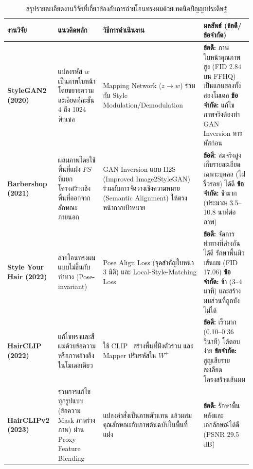 \begin{table}[htbp]
\caption{สรุปรายละเอียดงานวิจัยที่เกี่ยวข้องกับการถ่ายโอนทรงผมด้วยเทคนิคปัญญาประดิษฐ์}
\label{tab:literature_review}
\renewcommand{\arraystretch}{1.15}
\footnotesize
\begin{tabular}{|L{2.1cm}|L{3.3cm}|L{4.1cm}|L{4.6cm}|}
\hline
\textbf{งานวิจัย} & \textbf{แนวคิดหลัก} & \textbf{วิธีการดำเนินงาน} & \textbf{ผลลัพธ์ (ข้อดี/ข้อจำกัด)} \\
\hline
\textbf{StyleGAN2 (2020)}~\cite{karras2020analyzingimprovingimagequality}
& แปลงรหัส $w$ เป็นภาพใบหน้า โดยขยายความละเอียดทีละขั้น 4 ถึง 1024 พิกเซล
& Mapping Network ($z \rightarrow w$) ร่วมกับ Style Modulation/Demodulation
& \textbf{ข้อดี:} ภาพใบหน้าคุณภาพสูง (FID 2.84 บน FFHQ) เป็นแกนของทั้งสองโมเดล
  \newline \textbf{ข้อจำกัด:} แก้ไขภาพจริงต้องทำ GAN Inversion หารหัสก่อน \\
\hline
\textbf{Barbershop (2021)}~\cite{Zhu_2021}
& ผสมภาพโดยใช้พื้นที่แฝง $FS$ ที่แยกโครงสร้างเชิงพื้นที่ออกจากลักษณะภายนอก
& GAN Inversion แบบ II2S (Improved Image2StyleGAN)~\cite{zhu2021improvedstyleganembeddinggood} ร่วมกับการจัดวางเชิงความหมาย
  (Semantic Alignment) ให้ตรงหน้ากากเป้าหมาย
& \textbf{ข้อดี:} สมจริงสูง เก็บรายละเอียดเฉพาะบุคคล (ไฝ ริ้วรอย) ได้ดี
  \newline \textbf{ข้อจำกัด:} ช้ามาก (ประมาณ 3.5--10.8 นาทีต่อภาพ) \\
\hline
\textbf{Style Your Hair (2022)}~\cite{kim2022stylehairlatentoptimization}
& ถ่ายโอนทรงผมแบบไม่ขึ้นกับท่าทาง (Pose-invariant)
& Pose Align Loss (จุดสำคัญใบหน้า 3 มิติ) และ Local-Style-Matching Loss
& \textbf{ข้อดี:} จัดการท่าทางที่ต่างกันได้ดี รักษาพื้นผิวเส้นผม (FID 17.06)
  \newline \textbf{ข้อจำกัด:} ช้า (3--4 นาที) และสร้างผมส่วนที่ถูกบังไม่ได้ \\
\hline
\textbf{HairCLIP (2022)}~\cite{wei2022hairclipdesignhairtext}
& แก้ไขทรงและสีผมด้วยข้อความหรือภาพอ้างอิงในโมเดลเดียว
& ใช้ CLIP~\cite{radford2021learningtransferablevisualmodels} สร้างพื้นที่ฝังตัวร่วม และ Mapper ปรับรหัสใน $W^{+}$
& \textbf{ข้อดี:} เร็วมาก (0.10--0.36 วินาที) โต้ตอบง่าย
  \newline \textbf{ข้อจำกัด:} สูญเสียรายละเอียดโครงสร้างเส้นผม \\
\hline
\textbf{HairCLIPv2 (2023)}~\cite{wei2023hairclipv2unifyinghairediting}
& รวมการแก้ไขทุกรูปแบบ (ข้อความ Mask ภาพร่าง ภาพ) ผ่าน Proxy Feature Blending
& แปลงคำสั่งเป็นภาพตัวแทน แล้วผสมคุณลักษณะกับภาพต้นฉบับในพื้นที่แฝง
& \textbf{ข้อดี:} รักษาพื้นหลังและเอกลักษณ์ได้ดี (PSNR 29.5 dB)

\end{tabular}
\end{table}
